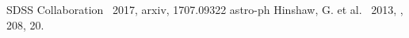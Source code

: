 \documentclass[manuscript]{aastex62}
\begin{document}
\begin{thebibliography}{}
     SDSS Collaboration \ 2017, arxiv, 1707.09322 astro-ph %
     Hinshaw, G. et al. \ 2013, \apjs, 208, 20. %
  \end{thebibliography}                                                           
                       





  
\end{document}
